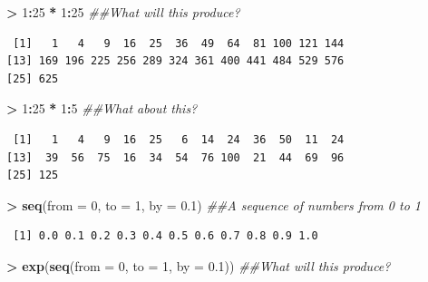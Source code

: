 \documentclass[]{krantz}
\makeatletter
\newenvironment{Shaded}{\begin{snugshade}}{\end{snugshade}}
\newcommand{\CommentTok}[1]{\textcolor[rgb]{0.37,0.37,0.37}{\textit{#1}}}
\newcommand{\DataTypeTok}[1]{\textcolor[rgb]{0.27,0.27,0.27}{#1}}
\newcommand{\DecValTok}[1]{\textcolor[rgb]{0.06,0.06,0.06}{#1}}
\newcommand{\FloatTok}[1]{\textcolor[rgb]{0.06,0.06,0.06}{#1}}
\newcommand{\KeywordTok}[1]{\textcolor[rgb]{0.27,0.27,0.27}{\textbf{#1}}}
\newcommand{\NormalTok}[1]{#1}
\newcommand{\OperatorTok}[1]{\textcolor[rgb]{0.43,0.43,0.43}{\textbf{#1}}}
\newcommand{\StringTok}[1]{\textcolor[rgb]{0.5,0.5,0.5}{#1}}
\newenvironment{kframe}{%
\medskip{}
\setlength{\fboxsep}{.8em}
 \def\at@end@of@kframe{}%
 \ifinner\ifhmode%
  \def\at@end@of@kframe{\end{minipage}}%
  \begin{minipage}{\columnwidth}%
 \fi\fi%
 \def\FrameCommand##1{\hskip\@totalleftmargin \hskip-\fboxsep
 \colorbox{shadecolor}{##1}\hskip-\fboxsep
     \hskip-\linewidth \hskip-\@totalleftmargin \hskip\columnwidth}%
 \MakeFramed {\advance\hsize-\width
   \@totalleftmargin\z@ \linewidth\hsize
   \@setminipage}}%
 {\par\unskip\endMakeFramed%
 \at@end@of@kframe}
\renewenvironment{Shaded}{\begin{kframe}}{\end{kframe}}
\makeatother
\begin{document}
\begin{Shaded}
\begin{Highlighting}[]
\OperatorTok{>}\StringTok{ }\DecValTok{1}\OperatorTok{:}\DecValTok{25} \OperatorTok{*}\StringTok{ }\DecValTok{1}\OperatorTok{:}\DecValTok{25}  \CommentTok{##What will this produce?}
\end{Highlighting}
\end{Shaded}

\begin{verbatim}
 [1]   1   4   9  16  25  36  49  64  81 100 121 144
[13] 169 196 225 256 289 324 361 400 441 484 529 576
[25] 625
\end{verbatim}

\begin{Shaded}
\begin{Highlighting}[]
\OperatorTok{>}\StringTok{ }\DecValTok{1}\OperatorTok{:}\DecValTok{25} \OperatorTok{*}\StringTok{ }\DecValTok{1}\OperatorTok{:}\DecValTok{5}  \CommentTok{##What about this?}
\end{Highlighting}
\end{Shaded}

\begin{verbatim}
 [1]   1   4   9  16  25   6  14  24  36  50  11  24
[13]  39  56  75  16  34  54  76 100  21  44  69  96
[25] 125
\end{verbatim}

\begin{Shaded}
\begin{Highlighting}[]
\OperatorTok{>}\StringTok{ }\KeywordTok{seq}\NormalTok{(}\DataTypeTok{from =} \DecValTok{0}\NormalTok{, }\DataTypeTok{to =} \DecValTok{1}\NormalTok{, }\DataTypeTok{by =} \FloatTok{0.1}\NormalTok{)  }\CommentTok{##A sequence of numbers from 0 to 1}
\end{Highlighting}
\end{Shaded}

\begin{verbatim}
 [1] 0.0 0.1 0.2 0.3 0.4 0.5 0.6 0.7 0.8 0.9 1.0
\end{verbatim}

\begin{Shaded}
\begin{Highlighting}[]
\OperatorTok{>}\StringTok{ }\KeywordTok{exp}\NormalTok{(}\KeywordTok{seq}\NormalTok{(}\DataTypeTok{from =} \DecValTok{0}\NormalTok{, }\DataTypeTok{to =} \DecValTok{1}\NormalTok{, }\DataTypeTok{by =} \FloatTok{0.1}\NormalTok{))  }\CommentTok{##What will this produce?}
\end{Highlighting}
\end{Shaded}
\end{document}
